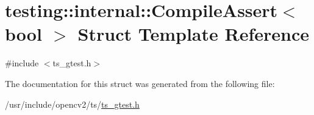 \hypertarget{structtesting_1_1internal_1_1CompileAssert}{\section{testing\-:\-:internal\-:\-:Compile\-Assert$<$ bool $>$ Struct Template Reference}
\label{structtesting_1_1internal_1_1CompileAssert}
}


{\ttfamily \#include $<$ts\-\_\-gtest.\-h$>$}



The documentation for this struct was generated from the following file\-:\begin{DoxyCompactItemize}
\item 
/usr/include/opencv2/ts/\hyperlink{ts__gtest_8h}{ts\-\_\-gtest.\-h}\end{DoxyCompactItemize}
